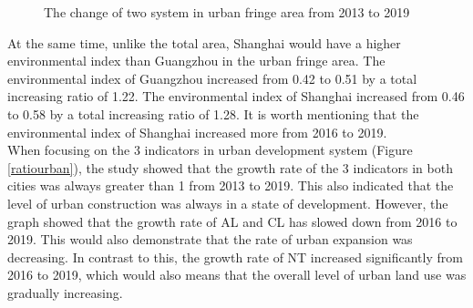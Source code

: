 \begin{figure}[H]
\centering
{}
\quad
{}

\caption{The change of two system in urban fringe area from 2013 to 2019}
\label{zonaldevelop}
\end{figure}

At the same time, unlike the total area, Shanghai would have a higher environmental index than Guangzhou in the urban fringe area. The environmental index of Guangzhou increased from 0.42 to 0.51 by a total increasing ratio of 1.22. The environmental index of Shanghai increased from 0.46 to 0.58 by a total increasing ratio of 1.28. It is worth mentioning that the environmental index of Shanghai increased more from 2016 to 2019.\\

When focusing on the 3 indicators in urban development system (Figure \ref{ratiourban}), the study showed that the growth rate of the 3 indicators in both cities was always greater than 1 from 2013 to 2019. This also indicated that the level of urban construction was always in a state of development. However, the graph showed that the growth rate of AL and CL has slowed down from 2016 to 2019. This would also demonstrate that the rate of urban expansion was decreasing. In contrast to this, the growth rate of NT increased significantly from 2016 to 2019, which would also means that the overall level of urban land use was gradually increasing.\\

